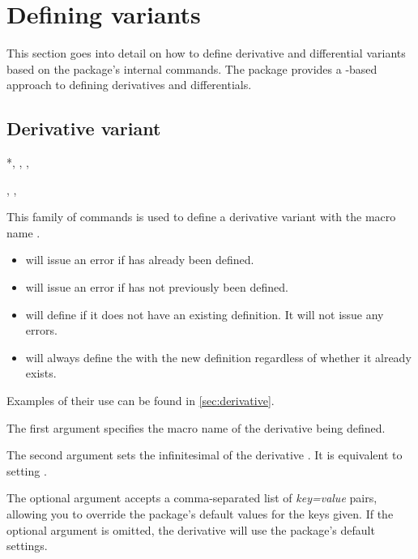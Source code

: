 	
	\clearpage
	\section{Defining variants} \label{sec:defvar}
This section goes into detail on how to define derivative and differential variants based on the package's internal commands. The \mypackage{} package provides a -based approach to defining derivatives and differentials.

\subsection{Derivative variant} \label{ssec:defvar_dv}

\begin{function}*{\NewDerivative, \RenewDerivative, \ProvideDerivative, \DeclareDerivative}
	\begin{syntax}
		, , 
	\end{syntax}
	This family of commands is used to define a derivative variant with the macro name . %
	\begin{itemize}
		\item {} will issue an error if  has already been defined.
		\item {} will issue an error if  has not previously been defined.
		\item {} will define  if it does not have an existing definition. It will not issue any errors.
		\item {} will always define the  with the new definition regardless of whether it already exists.
	\end{itemize}
	Examples of their use can be found in \cref{sec:derivative}.
	
	\begin{argument}{1}
		The first argument specifies the macro name of the derivative being defined.
	\end{argument}
	
	\begin{argument}{2}
		The second argument sets the infinitesimal of the derivative . It is equivalent to setting .
	\end{argument}
	
	\begin{argument}{3}
		The optional argument accepts a comma-separated list of \emph{key=value} pairs, allowing you to override the package's default values for the keys given. If the optional argument is omitted, the derivative will use the package's default settings.
	\end{argument}
\end{function}

